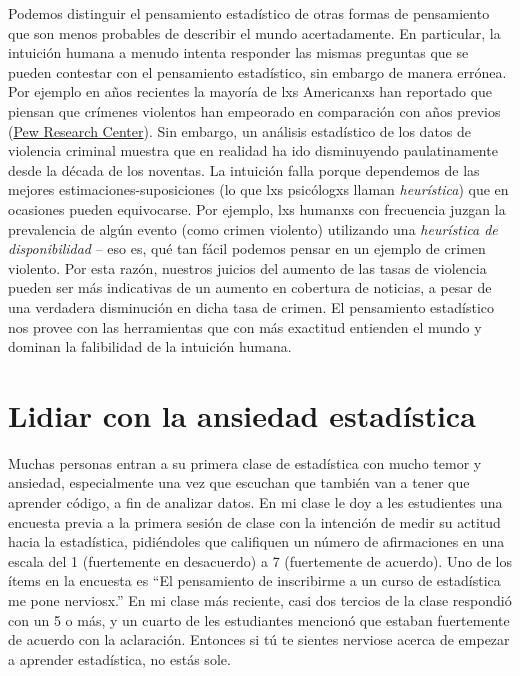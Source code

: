 \documentclass[
  12pt,
]{book}
\theoremstyle{definition}
\theoremstyle{definition}
\theoremstyle{definition}
\theoremstyle{remark}
\begin{document}
Podemos distinguir el pensamiento estadístico de otras formas de pensamiento que son menos probables de describir el mundo acertadamente. En particular, la intuición humana a menudo intenta responder las mismas preguntas que se pueden contestar con el pensamiento estadístico, sin embargo de manera errónea. Por ejemplo en años recientes la mayoría de lxs Americanxs han reportado que piensan que crímenes violentos han empeorado en comparación con años previos (\href{http://www.pewresearch.org/fact-tank/2018/01/30/5-facts-about-crime-in-the-u-s/}{Pew Research Center}). Sin embargo, un análisis estadístico de los datos de violencia criminal muestra que en realidad ha ido disminuyendo paulatinamente desde la década de los noventas. La intuición falla porque dependemos de las mejores estimaciones-suposiciones (lo que lxs psicólogxs llaman \emph{heurística}) que en ocasiones pueden equivocarse. Por ejemplo, lxs humanxs con frecuencia juzgan la prevalencia de algún evento (como crimen violento) utilizando una \emph{heurística de disponibilidad} -- eso es, qué tan fácil podemos pensar en un ejemplo de crimen violento. Por esta razón, nuestros juicios del aumento de las tasas de violencia pueden ser más indicativas de un aumento en cobertura de noticias, a pesar de una verdadera disminución en dicha tasa de crimen. El pensamiento estadístico nos provee con las herramientas que con más exactitud entienden el mundo y dominan la falibilidad de la intuición humana.

\hypertarget{lidiar-con-la-ansiedad-estaduxedstica}{%
\section{Lidiar con la ansiedad estadística}\label{lidiar-con-la-ansiedad-estaduxedstica}}

Muchas personas entran a su primera clase de estadística con mucho temor y ansiedad, especialmente una vez que escuchan que también van a tener que aprender código, a fin de analizar datos. En mi clase le doy a les estudientes una encuesta previa a la primera sesión de clase con la intención de medir su actitud hacia la estadística, pidiéndoles que califiquen un número de afirmaciones en una escala del 1 (fuertemente en desacuerdo) a 7 (fuertemente de acuerdo). Uno de los ítems en la encuesta es ``El pensamiento de inscribirme a un curso de estadística me pone nerviosx.'' En mi clase más reciente, casi dos tercios de la clase respondió con un 5 o más, y un cuarto de les estudiantes mencionó que estaban fuertemente de acuerdo con la aclaración. Entonces si tú te sientes nerviose acerca de empezar a aprender estadística, no estás sole.
\end{document}
